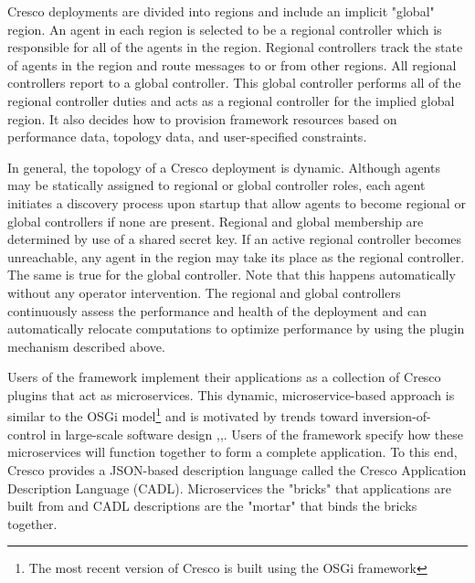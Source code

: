 \documentclass{article}
\begin{document}
	Cresco deployments are divided into regions and include an implicit "global" region. An agent in each region is selected to be a regional controller which is responsible for all of the agents in the region. Regional controllers track the state of  agents in the region and route messages to or from other regions. All regional controllers report to a global controller. This global controller performs all of the regional controller duties and acts as a regional controller for the implied global region. It also decides how to provision framework resources based on performance data, topology data, and user-specified constraints.
	
	In general, the topology of a Cresco deployment is dynamic. Although agents may be statically assigned to regional or global controller roles, each agent initiates a discovery process upon startup that allow agents to become regional or global controllers if none are present. Regional and global membership are determined by use of a shared secret key. If an active regional controller becomes unreachable, any agent in the region may take its place as the regional controller. The same is true for the global controller. Note that this happens automatically without any operator intervention. The regional and global controllers continuously assess the performance and health of the deployment and can automatically relocate computations to optimize performance by using the plugin mechanism described above.
	
    Users of the framework implement their applications as a collection of Cresco plugins that act as microservices. This dynamic, microservice-based approach is similar to the OSGi model\footnote{The most recent version of Cresco is built using the OSGi framework} and is motivated by trends toward inversion-of-control in large-scale software design \cite{osgi},\cite{spring},\cite{kubernetes}. Users of the framework specify how these microservices will function together to form a complete application. To this end, Cresco provides a JSON-based description language called the Cresco Application Description Language (CADL). Microservices the "bricks" that applications are built from and CADL descriptions are the "mortar" that binds the bricks together.
    
\end{document}
